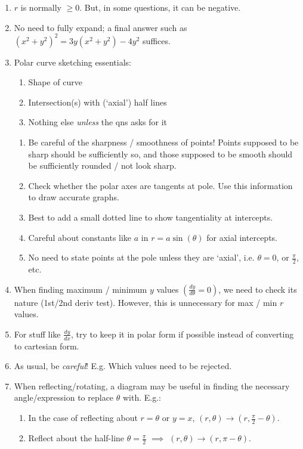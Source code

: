 \documentclass[oneside]{book}
\begin{document}
\begin{IN}
  \begin{enumerate}
    \item \(r\) is normally \(\geq 0\). But, in some questions, it can be negative.
    \item No need to fully expand; a final answer such as \((x^2+y^2)^2=3y(x^2+y^2)-4y^2\) suffices.
    \item Polar curve sketching essentials:
    \begin{enumerate}
      \item Shape of curve
      \item Intersection(s) with (`axial') half lines
      \item Nothing else \emph{unless} the qns asks for it
    \end{enumerate}
    \begin{enumerate}[label=\(\qed\)]
      \item Be careful of the sharpness / smoothness of points! Points supposed to be sharp should be sufficiently so, and those supposed to be smooth should be sufficiently rounded / not look sharp.
      \item Check whether the polar axes are tangents at pole. Use this information to draw accurate graphs.
      \item Best to add a small dotted line to show tangentiality at intercepts.
      \item Careful about constants like \(a\) in \(r=a\sin(\theta)\) for axial intercepts.
      \item No need to state points at the pole unless they are `axial', i.e. \(\theta=0\), or \(\frac{\pi}{2}\), etc.
    \end{enumerate}
    \item When finding maximum / minimum \(y\) values \(\left(\frac{dy}{d\theta}=0\right)\), we need to check its nature (1st/2nd deriv test). However, this is unnecessary for max / min \(r\) values.
    \item For stuff like \(\frac{dy}{dx}\), try to keep it in polar form if possible instead of converting to cartesian form.
    \item As usual, be \emph{careful}! E.g. Which values need to be rejected.
    \item When reflecting/rotating, a diagram may be useful in finding the necessary angle/expression to replace \(\theta\) with. E.g.: \small
    \begin{enumerate}
      \item In the case of reflecting about \(r=\theta\) or \(y=x\), \((r,\theta) \to (r,\frac{\pi}{2}-\theta)\).
      \item Reflect about the half-line \(\theta=\frac{\pi}{2}\) \(\implies\) \((r,\theta) \to (r,\pi-\theta)\).
    \end{enumerate} \normalsize
  \end{enumerate}
\end{IN}
\end{document}
